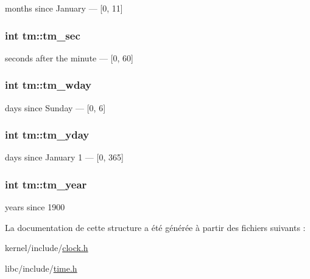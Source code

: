 months since January — \mbox{[}0, 11\mbox{]} \hypertarget{structtm_a4d098a9a5c03a00b2ee61e10851de81e}{
\subsubsection[{tm\+\_\+sec}]{\setlength{\rightskip}{0pt plus 5cm}int tm\+::tm\+\_\+sec}}\label{structtm_a4d098a9a5c03a00b2ee61e10851de81e}
seconds after the minute — \mbox{[}0, 60\mbox{]} \hypertarget{structtm_afe81a8c46f1c693c43f259b288859f4f}{
\subsubsection[{tm\+\_\+wday}]{\setlength{\rightskip}{0pt plus 5cm}int tm\+::tm\+\_\+wday}}\label{structtm_afe81a8c46f1c693c43f259b288859f4f}
days since Sunday — \mbox{[}0, 6\mbox{]} \hypertarget{structtm_a93a0ba77cc23796df84405dcbcc57eb1}{
\subsubsection[{tm\+\_\+yday}]{\setlength{\rightskip}{0pt plus 5cm}int tm\+::tm\+\_\+yday}}\label{structtm_a93a0ba77cc23796df84405dcbcc57eb1}
days since January 1 — \mbox{[}0, 365\mbox{]} \hypertarget{structtm_a33adf78fd6476b2120ce3b9c4a852053}{
\subsubsection[{tm\+\_\+year}]{\setlength{\rightskip}{0pt plus 5cm}int tm\+::tm\+\_\+year}}\label{structtm_a33adf78fd6476b2120ce3b9c4a852053}
years since 1900 

La documentation de cette structure a été générée à partir des fichiers suivants \+:\begin{DoxyCompactItemize}
\item 
kernel/include/\hyperlink{clock_8h}{clock.\+h}\item 
libc/include/\hyperlink{time_8h}{time.\+h}\end{DoxyCompactItemize}
